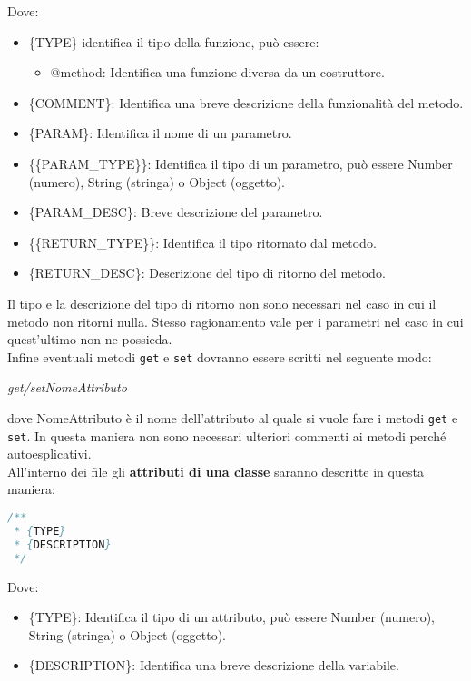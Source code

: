 Dove:
\begin{itemize}
\item \{TYPE\} identifica il tipo della funzione, può essere:
\begin {itemize}
\item @method: Identifica una funzione diversa da un costruttore.
\end{itemize}
\item \{COMMENT\}: Identifica una breve descrizione della funzionalità del metodo.
\item \{PARAM\}: Identifica il nome di un parametro.
\item \{\{PARAM\_TYPE\}\}: Identifica il tipo di un parametro, può essere Number (numero), String (stringa) o Object (oggetto).
\item \{PARAM\_DESC\}: Breve descrizione del parametro.
\item \{\{RETURN\_TYPE\}\}: Identifica il tipo ritornato dal metodo.
\item \{RETURN\_DESC\}: Descrizione del tipo di ritorno del metodo.
\end{itemize}
Il tipo e la descrizione del tipo di ritorno non sono necessari nel caso in cui il metodo non ritorni nulla. Stesso ragionamento vale per i parametri nel caso in cui quest'ultimo non ne possieda.
\\



Infine eventuali metodi \texttt{get} e \texttt{set} dovranno essere scritti nel seguente modo:
\begin{center}
\textit{get/setNomeAttributo}
\end{center}
dove NomeAttributo è il nome dell'attributo al quale si vuole fare i metodi \texttt{get} e \texttt{set}. In questa maniera non sono necessari ulteriori commenti ai metodi perché autoesplicativi.
\\



All'interno dei file gli \textbf{attributi di una classe} saranno descritte in questa maniera:

\begin{lstlisting}[language=Java]
/**
 * {TYPE}
 * {DESCRIPTION}
 */ 
\end{lstlisting}

Dove:
\begin{itemize}
\item \{TYPE\}: Identifica il tipo di un attributo, può essere Number (numero), String (stringa) o Object (oggetto).
\item \{DESCRIPTION\}: Identifica una breve descrizione della variabile.
\end{itemize}


